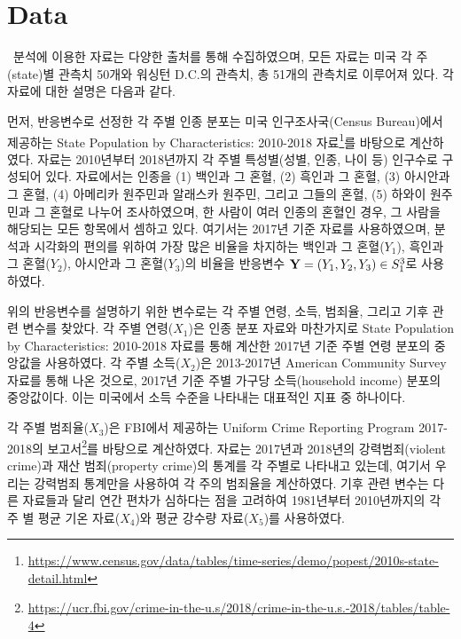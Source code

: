 \section{Data}
\label{sec:dat}


\ \quad 분석에 이용한 자료는 다양한 출처를 통해 수집하였으며, 모든 자료는 미국 각 주(state)별 관측치 50개와 워싱턴 D.C.의 관측치, 총 51개의 관측치로 이루어져 있다. 각 자료에 대한 설명은 다음과 같다.

먼저, 반응변수로 선정한 각 주별 인종 분포는 미국 인구조사국(Census Bureau)에서 제공하는 State Population by Characteristics: 2010-2018 자료\footnote{\url{https://www.census.gov/data/tables/time-series/demo/popest/2010s-state-detail.html}}를 바탕으로 계산하였다. 자료는 2010년부터 2018년까지 각 주별 특성별(성별, 인종, 나이 등) 인구수로 구성되어 있다. 자료에서는 인종을 (1) 백인과 그 혼혈, (2) 흑인과 그 혼혈, (3) 아시안과 그 혼혈, (4) 아메리카 원주민과 알래스카 원주민, 그리고 그들의 혼혈, (5) 하와이 원주민과 그 혼혈로 나누어 조사하였으며, 한 사람이 여러 인종의 혼혈인 경우, 그 사람을 해당되는 모든 항목에서 셈하고 있다. 여기서는 2017년 기준 자료를 사용하였으며, 분석과 시각화의 편의를 위하여 가장 많은 비율을 차지하는 백인과 그 혼혈($Y_1$), 흑인과 그 혼혈($Y_2$), 아시안과 그 혼혈($Y_3$)의 비율을 반응변수 $\mathbf{Y} = (Y_1, Y_2,Y_3) \in S_1^3$로 사용하였다.

위의 반응변수를 설명하기 위한 변수로는 각 주별 연령, 소득, 범죄율, 그리고 기후 관련 변수를 찾았다. 각 주별 연령($X_1$)은 인종 분포 자료와 마찬가지로  State Population by Characteristics: 2010-2018 자료를 통해 계산한 2017년 기준 주별 연령 분포의 중앙값을 사용하였다. 각 주별 소득($ X_2 $)은 2013-2017년 American Community Survey 자료를 통해 나온 것으로, 2017년 기준 주별 가구당 소득(household income) 분포의 중앙값이다. 이는 미국에서 소득 수준을 나타내는 대표적인 지표 중 하나이다.

각 주별 범죄율($ X_3 $)은 FBI에서 제공하는 Uniform Crime Reporting Program 2017-2018의 보고서\footnote{\url{https://ucr.fbi.gov/crime-in-the-u.s/2018/crime-in-the-u.s.-2018/tables/table-4}}를 바탕으로 계산하였다. 자료는 2017년과 2018년의 강력범죄(violent crime)과 재산 범죄(property crime)의 통계를 각 주별로 나타내고 있는데, 여기서 우리는 강력범죄 통계만을 사용하여 각 주의 범죄율을 계산하였다. 기후 관련 변수는 다른 자료들과 달리 연간 편차가 심하다는 점을 고려하여 1981년부터 2010년까지의 각 주 별 평균 기온 자료($ X_4 $)와 평균 강수량 자료($ X_5 $)를 사용하였다.

